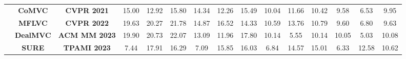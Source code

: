 \documentclass{article}
\theoremstyle{plain}
\theoremstyle{definition}
\theoremstyle{remark}
\begin{document}
\begin{table}[]
{\begin{tabular}{c|cc|ccc|ccc|ccc|ccc}
                            & \multicolumn{1}{c|}{\textbf{CoMVC}}   & \textbf{CVPR 2021}   & 15.00                                 & 12.92                                 & 15.80                                 & 14.34                                 & 12.26                                 & 15.49                                 & 10.04                                 & 11.66                                 & 10.42                                 & 9.58                                  & 6.53                                  & 9.95                                  \\
                            & \multicolumn{1}{c|}{\textbf{MFLVC}}   & \textbf{CVPR 2022}   & 19.63                                 & 20.27                                 & 21.78                                 & {\color[HTML]{3531FF} 14.87}          & {\color[HTML]{3531FF} 16.52}          & 14.33                                 & {\color[HTML]{3531FF} 10.59}          & {\color[HTML]{3531FF} 13.76}          & 10.79                                 & 9.60                                  & 6.80                                  & 9.63                                  \\
                            & \multicolumn{1}{c|}{\textbf{DealMVC}} & \textbf{ACM MM 2023} & {\color[HTML]{3531FF} 19.90}          & {\color[HTML]{3531FF} 20.73}          & {\color[HTML]{3531FF} 22.07}          & 13.09                                 & 11.96                                 & {\color[HTML]{3531FF} 17.80}          & 10.14                                 & 5.55                                  & 10.14                                 & {\color[HTML]{3531FF} 10.05}          & 5.03                                  & 10.08                                 \\
                            & \multicolumn{1}{c|}{\textbf{SURE}}    & \textbf{TPAMI 2023}  & 7.44                                  & 17.91                                 & 16.29                                 & 7.09                                  & 15.85                                 & 16.03                                 & 6.84                                  & 14.57                                 & {\color[HTML]{3531FF} 15.01}          & 6.33                                  & {\color[HTML]{3531FF} 12.58}          & 10.62                                 \\

\end{tabular}}
\end{table}
\end{document}
